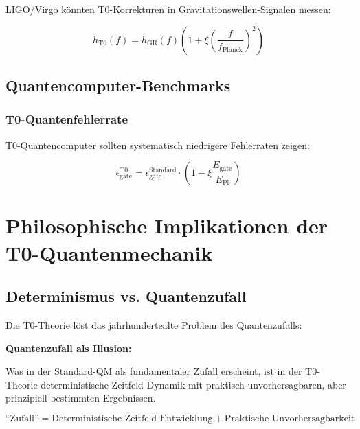 \documentclass[12pt,a4paper]{article}
\newcommand{\xipar}{\xi}
\newcommand{\EPlanck}{E_{\text{Pl}}}
\begin{document}
	LIGO/Virgo könnten T0-Korrekturen in Gravitationswellen-Signalen messen:
	
	\begin{equation}
		h_{\text{T0}}(f) = h_{\text{GR}}(f) \left(1 + \xipar \left(\frac{f}{f_{\text{Planck}}}\right)^2\right)
	\end{equation}
	
	\subsection{Quantencomputer-Benchmarks}
	
	\subsubsection{T0-Quantenfehlerrate}
	
	T0-Quantencomputer sollten systematisch niedrigere Fehlerraten zeigen:
	
	\begin{equation}
		\epsilon_{\text{gate}}^{\text{T0}} = \epsilon_{\text{gate}}^{\text{Standard}} \cdot \left(1 - \xipar \frac{E_{\text{gate}}}{\EPlanck}\right)
	\end{equation}
	
	\section{Philosophische Implikationen der T0-Quantenmechanik}
	
	\subsection{Determinismus vs. Quantenzufall}
	
	Die T0-Theorie löst das jahrhundertealte Problem des Quantenzufalls:
	
	\begin{tcolorbox}[colback=purple!5!white,colframe=purple!75!black,title=T0-Determinismus]
		\textbf{Quantenzufall als Illusion:}
		
		Was in der Standard-QM als fundamentaler Zufall erscheint, ist in der T0-Theorie deterministische Zeitfeld-Dynamik mit praktisch unvorhersagbaren, aber prinzipiell bestimmten Ergebnissen.
		
		\begin{equation}
			\text{``Zufall''} = \text{Deterministische Zeitfeld-Entwicklung} + \text{Praktische Unvorhersagbarkeit}
		\end{equation}
	\end{tcolorbox}
	
\end{document}
